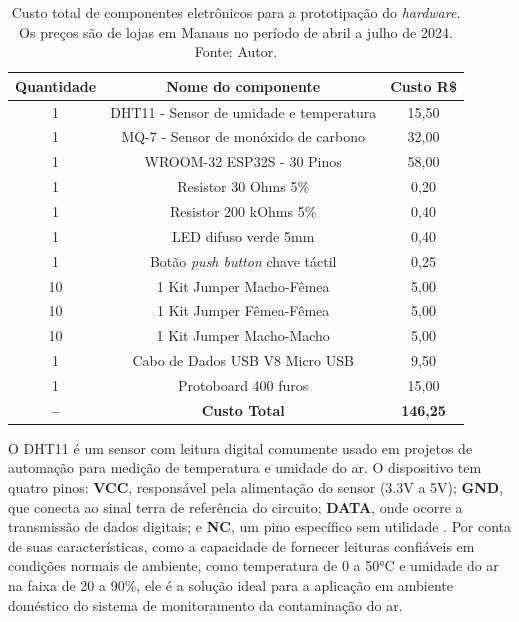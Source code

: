 \begin{table}[h!]
    \centering
    \caption{Custo total de componentes eletrônicos para a prototipação do \textit{hardware}. Os preços são de lojas em Manaus no período de abril a julho de 2024. Fonte: Autor.}\label{tabPrecoHardware}
    \begin{tabular}{|c|c|c|}
        \hline
        \textbf{Quantidade} & \textbf{Nome do componente} & \textbf{Custo R\$} \\
        \hline
        1 & DHT11 - Sensor de umidade e temperatura & 15,50 \\
        \hline
        1 & MQ-7 - Sensor de monóxido de carbono & 32,00 \\
        \hline
        1 & WROOM-32 ESP32S - 30 Pinos & 58,00 \\
        \hline
        1 & Resistor 30 Ohms 5\% & 0,20 \\
        \hline
        1 & Resistor 200 kOhms 5\% & 0,40 \\
        \hline
        1 & LED difuso verde 5mm & 0,40 \\
        \hline
        1 & Botão \textit{push button} chave táctil & 0,25 \\
        \hline
        10 & 1 Kit Jumper Macho-Fêmea & 5,00 \\
        \hline
        10 & 1 Kit Jumper Fêmea-Fêmea & 5,00 \\
        \hline
        10 & 1 Kit Jumper Macho-Macho & 5,00 \\
        \hline
        1 & Cabo de Dados USB V8 Micro USB & 9,50 \\
        \hline
        1 & Protoboard 400 furos & 15,00 \\
        \hline
        \textbf{--} & \textbf{Custo Total} & \textbf{146,25} \\
        \hline
    \end{tabular}
\end{table}

O DHT11 é um sensor com leitura digital comumente usado em projetos de automação para medição de temperatura e umidade do ar. O dispositivo 
tem quatro pinos: \textbf{VCC}, responsável pela alimentação do sensor (3.3V a 5V); \textbf{GND}, que conecta ao sinal terra de referência do circuito; \textbf{DATA}, onde ocorre a transmissão 
de dados digitais; e \textbf{NC}, um pino específico sem utilidade \cite{dht11-documentation}. Por conta de suas características, como a capacidade de fornecer leituras confiáveis em condições normais de ambiente, como 
temperatura de 0 a 50°C e umidade do ar na faixa de 20 a 90\%, ele é a solução ideal para a aplicação em ambiente doméstico do sistema de monitoramento da contaminação do ar.

